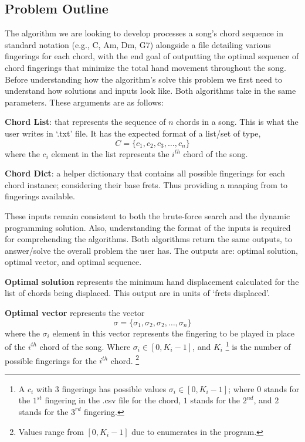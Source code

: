 \documentclass[conference]{IEEEtran}
\begin{document}
\subsection{Problem Outline}
The algorithm we are looking to develop processes a song's chord sequence in standard notation (e.g., C, Am, Dm, G7) alongside a file detailing various fingerings for each chord, with the end goal of outputting the optimal sequence of chord fingerings that minimize the total hand movement throughout the song. Before understanding how the algorithm's solve this problem we first need to understand how solutions and inputs look like.
\newline 
\indent Both algorithms take in the same parameters. These arguments are as follows: 

\textbf{Chord List}: that represents the sequence of $n$ chords in a song. This is what the user writes in `.txt' file. It has the expected format of a list/set of type, \[ C = \{c_1, c_2, c_3, \ldots, c_n\} \] where the \(c_i\) element in the list represents the \(i^{th}\) chord of the song. 

\textbf{Chord Dict}: a helper dictionary that contains all possible fingerings for each chord instance; considering their base frets. Thus providing a maaping from to fingerings available.

\indent These inputs remain consistent to both the brute-force search and the dynamic programming solution. Also, understanding the format of the inputs is required for comprehending the algorithms. Both algorithms return the same outputs, to answer/solve the overall problem the user has. The outputs are: optimal solution, optimal vector, and optimal sequence.

\textbf{Optimal solution} represents the minimum hand displacement calculated for the list of chords being displaced. This output are in units of `frets displaced'.

\textbf{Optimal vector} represents the vector \[ \sigma = \{\sigma_1, \sigma_2, \sigma_2, \ldots, \sigma_n\} \] where the \(\sigma_i\) element in this vector represents the fingering to be played in place of the \(i^{th}\) chord of the song. 
Where \( \sigma_i \in [0, K_i - 1] \), and \(K_i\) \footnote{A \(c_i\) with 3 fingerings has possible values \( \sigma_i \in [0, K_i - 1]\); where $0$ stands for the $1^{st}$ fingering in the .csv file for the chord, $1$ stands for the $2^{nd}$, and $2$ stands for the $3^{rd}$ fingering.} 
is the number of possible fingerings for the \(i^{th}\) chord. \footnote{Values range from \( [0, K_i - 1] \) due to enumerates in the program.}
\end{document}
